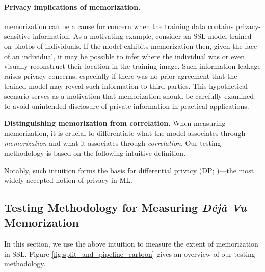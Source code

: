 \paragraph{Privacy implications of \dejavu memorization.} \Dejavu memorization can be a cause for concern when the training data contains privacy-sensitive information. As a motivating example, consider an SSL model trained on photos of individuals. If the model exhibits \dejavu memorization then, given the face of an individual, it may be possible to infer where the individual was or even visually reconstruct their location in the training image. Such information leakage raises privacy concerns, especially if there was no prior agreement that the trained model may reveal such information to third parties. This hypothetical scenario serves as a motivation that \dejavu memorization should be carefully examined to avoid unintended disclosure of private information in practical applications.



\textbf{Distinguishing memorization from correlation.} When measuring \dejavu memorization, it is crucial to differentiate what the model associates through \emph{memorization} and what it associates through \emph{correlation}. Our testing methodology is based on the following intuitive definition.

Notably, such intuition forms the basis for differential privacy (DP; \cite{dwork2006calibrating, dwork2013algorithmic})---the most widely accepted notion of privacy in ML.

\subsection{Testing Methodology for Measuring \emph{Déjà Vu} Memorization}
\label{sec:notation and setup}

In this section, we use the above intuition to measure the extent of \dejavu memorization in SSL. Figure \ref{fig:split_and_pipeline_cartoon} gives an overview of our testing methodology.
\vspace{-0.75em}
